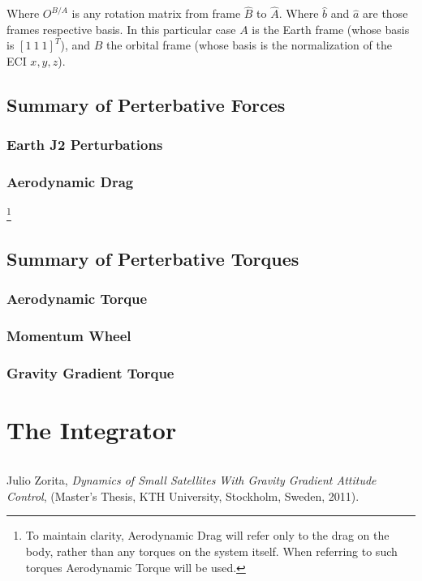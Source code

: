 \documentclass[12pt,a4paper]{article}
\begin{document}
Where $O^{B/A}$ is any rotation matrix from frame $\hat{B}$ to $\hat{A}$. Where $\hat{b}$ and $\hat{a}$ are those frames respective basis. In this particular case $A$ is the Earth frame (whose basis is $[1 ~1 ~1]^{T}$), and $B$ the orbital frame (whose basis is the normalization of the ECI $x,y,z$).

\subsection{Summary of Perterbative Forces}
\label{sec:PertF}

\subsubsection{Earth J2 Perturbations}
\subsubsection{Aerodynamic Drag}
\footnote{To maintain clarity, Aerodynamic Drag will refer only to the drag on the body, rather than any torques on the system itself. When referring to such torques Aerodynamic Torque will be used.}


\subsection{Summary of Perterbative Torques}
\label{sec:PertT}

\subsubsection{Aerodynamic Torque}
\subsubsection{Momentum Wheel}
\subsubsection{Gravity Gradient Torque}

\section{The Integrator}


\begin{lstlisting}

\end{lstlisting}

\begin{thebibliography}{99}
Julio Zorita, \emph{Dynamics of Small Satellites With Gravity Gradient Attitude Control}, (Master's Thesis, KTH University, Stockholm, Sweden, 2011).
\end{thebibliography}
\end{document}
